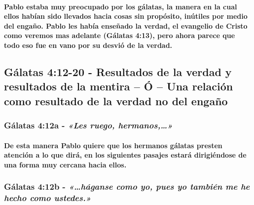 \documentclass[11a pt,twoside]{article}
\newcommand{\scripture}[1]{%
  {\fontsize{12pt}{16pt}\selectfont\ScriptureFont\itshape #1}%
}
\let\oldsubsection\subsection
\renewcommand{\subsection}{\needspace{5\baselineskip}\oldsubsection}
\let\oldsubsubsection\subsubsection
\renewcommand{\subsubsection}{\needspace{4\baselineskip}\oldsubsubsection}
\let\oldparagraph\paragraph
\renewcommand{\paragraph}{\needspace{3\baselineskip}\oldparagraph}
\begin{document}
\paragraph{Pablo estaba muy preocupado por los gálatas, la manera en la
cual ellos habían sido llevados hacia cosas sin propósito, inútiles por
medio del engaño. Pablo les había enseñado la verdad, el evangelio de
Cristo como veremos mas adelante (Gálatas 4:13), pero ahora parece que
todo eso fue en vano por su desvió de la
verdad.}\label{pablo-estaba-muy-preocupado-por-los-guxe1latas-la-manera-en-la-cual-ellos-habuxedan-sido-llevados-hacia-cosas-sin-propuxf3sito-inuxfatiles-por-medio-del-engauxf1o.-pablo-les-habuxeda-enseuxf1ado-la-verdad-el-evangelio-de-cristo-como-veremos-mas-adelante-guxe1latas-413-pero-ahora-parece-que-todo-eso-fue-en-vano-por-su-desviuxf3-de-la-verdad.}

\subsection{Gálatas 4:12-20 - Resultados de la verdad y resultados de la
mentira -- Ó -- Una relación como resultado de la verdad no del
engaño}\label{guxe1latas-412-20---resultados-de-la-verdad-y-resultados-de-la-mentira-uxf3-una-relaciuxf3n-como-resultado-de-la-verdad-no-del-engauxf1o}

\subsubsection{\texorpdfstring{Gálatas 4:12a -
\scripture{«Les ruego, hermanos,…»}}{Gálatas 4:12a - }}\label{guxe1latas-412a---les-ruego-hermanos}

\paragraph{De esta manera Pablo quiere que los hermanos gálatas presten
atención a lo que dirá, en los siguientes pasajes estará dirigiéndose de
una forma muy cercana hacia
ellos.}\label{de-esta-manera-pablo-quiere-que-los-hermanos-guxe1latas-presten-atenciuxf3n-a-lo-que-diruxe1-en-los-siguientes-pasajes-estaruxe1-dirigiuxe9ndose-de-una-forma-muy-cercana-hacia-ellos.}

\subsubsection{\texorpdfstring{Gálatas 4:12b -
\scripture{«…háganse como yo, pues yo también me he hecho como ustedes.»}}{Gálatas 4:12b - }}\label{guxe1latas-412b---huxe1ganse-como-yo-pues-yo-tambiuxe9n-me-he-hecho-como-ustedes.}
\end{document}

